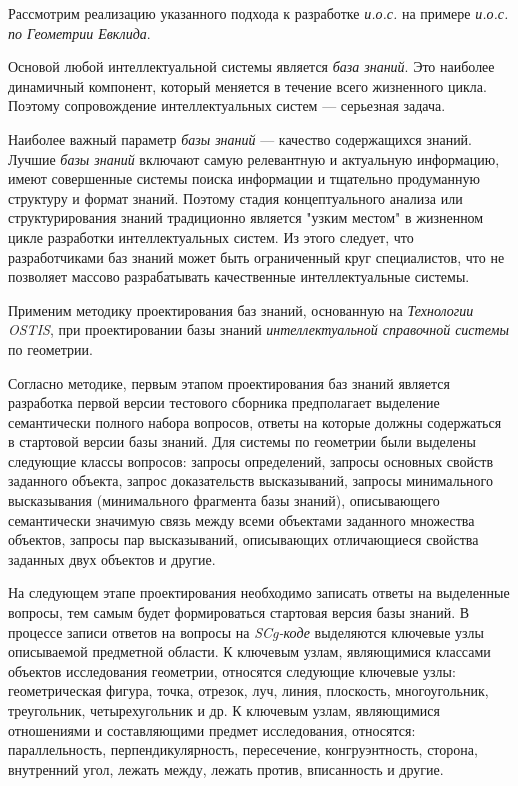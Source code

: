 Рассмотрим реализацию указанного подхода к разработке \textit{и.о.с.} на примере \textit{и.о.с. по Геометрии Евклида}.

Основой любой интеллектуальной системы является \textit{база знаний}. Это наиболее динамичный компонент, который меняется в течение всего жизненного цикла. Поэтому сопровождение интеллектуальных систем --- серьезная задача.

Наиболее важный параметр \textit{базы знаний} --- качество содержащихся знаний. Лучшие \textit{базы знаний} включают самую релевантную и актуальную информацию, имеют совершенные системы поиска информации и тщательно продуманную структуру и формат знаний. Поэтому стадия концептуального анализа или структурирования знаний традиционно является "узким местом"{} в жизненном цикле разработки интеллектуальных систем. Из этого следует, что разработчиками баз знаний может быть ограниченный круг специалистов, что не позволяет массово разрабатывать качественные интеллектуальные системы.

Применим методику проектирования баз знаний, основанную на \textit{Технологии OSTIS}, при проектировании базы знаний \textit{интеллектуальной справочной системы} по геометрии.

Согласно методике, первым этапом проектирования баз знаний является разработка первой версии тестового сборника предполагает выделение семантически полного набора вопросов, ответы на которые должны содержаться в стартовой версии базы знаний. Для системы по геометрии были выделены следующие классы вопросов: запросы определений, запросы основных свойств заданного объекта, запрос доказательств высказываний, запросы минимального высказывания (минимального фрагмента базы знаний), описывающего семантически значимую связь между всеми объектами заданного множества объектов, запросы пар высказываний, описывающих отличающиеся свойства заданных двух объектов и другие.

На следующем этапе проектирования необходимо записать ответы на выделенные вопросы, тем самым будет формироваться стартовая версия базы знаний. В процессе записи ответов на вопросы на \textit{SCg-коде} выделяются ключевые узлы описываемой предметной области. К ключевым узлам, являющимися классами объектов исследования геометрии, относятся следующие ключевые узлы: геометрическая фигура, точка, отрезок, луч, линия, плоскость, многоугольник, треугольник, четырехугольник и др. К ключевым узлам, являющимися отношениями и составляющими предмет исследования, относятся: параллельность, перпендикулярность, пересечение, конгруэнтность, сторона, внутренний угол, лежать между, лежать против, вписанность и другие.

